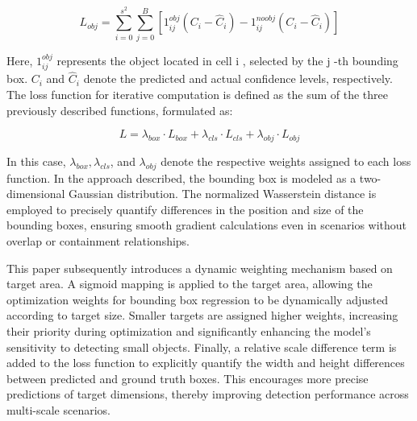 \documentclass{article}
\begin{document}
\begin{equation*}
L_{o b j}=\sum_{i=0}^{s^{2}} \sum_{j=0}^{B}\left[1_{i j}^{o b j}\left(C_{i}-\hat{C}_{i}\right)-1_{i j}^{n o o b j}\left(C_{i}-\hat{C}_{i}\right)\right] \tag{17}
\end{equation*}


Here, $1_{i j}^{o b j}$ represents the object located in cell i , selected by the j -th bounding box. $C_{i}$ and $\hat{C}_{i}$ denote the predicted and actual confidence levels, respectively. The loss function for iterative computation is defined as the sum of the three previously described functions, formulated as:


\begin{equation*}
L=\lambda_{b o x} \cdot L_{b o x}+\lambda_{c l s} \cdot L_{c l s}+\lambda_{o b j} \cdot L_{o b j} \tag{18}
\end{equation*}


In this case, $\lambda_{b o x}, \lambda_{c l s}$, and $\lambda_{o b j}$ denote the respective weights assigned to each loss function. In the approach described, the bounding box is modeled as a two-dimensional Gaussian distribution. The normalized Wasserstein distance is employed to precisely quantify differences in the position and size of the bounding boxes, ensuring smooth gradient calculations even in scenarios without overlap or containment relationships.

This paper subsequently introduces a dynamic weighting mechanism based on target area. A sigmoid mapping is applied to the target area, allowing the optimization weights for bounding box regression to be dynamically adjusted according to target size. Smaller targets are assigned higher weights, increasing their priority during optimization and significantly enhancing the model's sensitivity to detecting small objects. Finally, a relative scale difference term is added to the loss function to explicitly quantify the width and height differences between predicted and ground truth boxes. This encourages more precise predictions of target dimensions, thereby improving detection performance across multi-scale scenarios.
\end{document}
